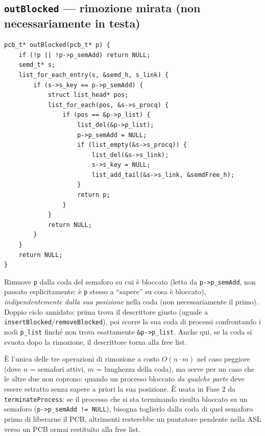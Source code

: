 \documentclass[11pt,a4paper]{article}
\newcommand{\code}[1]{\texttt{#1}}
\newcommand{\func}[1]{\textbf{\texttt{#1}}}
\begin{document}
\subsection{\func{outBlocked} --- rimozione mirata (non necessariamente in testa)}
\begin{lstlisting}
pcb_t* outBlocked(pcb_t* p) {
    if (!p || !p->p_semAdd) return NULL;
    semd_t* s;
    list_for_each_entry(s, &semd_h, s_link) {
        if (s->s_key == p->p_semAdd) {
            struct list_head* pos;
            list_for_each(pos, &s->s_procq) {
                if (pos == &p->p_list) {
                    list_del(&p->p_list);
                    p->p_semAdd = NULL;
                    if (list_empty(&s->s_procq)) {
                        list_del(&s->s_link);
                        s->s_key = NULL;
                        list_add_tail(&s->s_link, &semdFree_h);
                    }
                    return p;
                }
            }
            return NULL;
        }
    }
    return NULL;
}
\end{lstlisting}
Rimuove \code{p} dalla coda del semaforo su cui è bloccato (letto da
\code{p->p\_semAdd}, non passato esplicitamente: è \code{p} stesso a
``sapere'' su cosa è bloccato), \emph{indipendentemente dalla sua posizione}
nella coda (non necessariamente il primo). Doppio ciclo annidato: prima trova
il descrittore giusto (uguale a \code{insertBlocked}/\code{removeBlocked}),
poi scorre la sua coda di processi confrontando i nodi \code{p\_list} finché
non trova esattamente \code{\&p->p\_list}. Anche qui, se la coda si svuota
dopo la rimozione, il descrittore torna alla free list.

È l'unica delle tre operazioni di rimozione a costo $O(n \cdot m)$ nel caso
peggiore (dove $n$ = semafori attivi, $m$ = lunghezza della coda), ma serve
per un caso che le altre due non coprono: quando un processo bloccato
\emph{da qualche parte} deve essere estratto senza sapere a priori la sua
posizione. È usata in Fase 2 da \code{terminateProcess}: se il processo che
si sta terminando risulta bloccato su un semaforo (\code{p->p\_semAdd !=
NULL}), bisogna toglierlo dalla coda di quel semaforo prima di liberarne il
PCB, altrimenti resterebbe un puntatore pendente nella ASL verso un PCB ormai
restituito alla free list.
\end{document}
